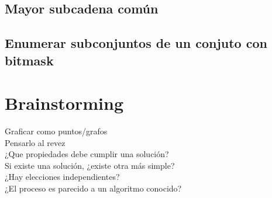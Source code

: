     \subsection{Mayor subcadena común}
    \subsection{Enumerar subconjuntos de un conjuto con bitmask}

\section{Brainstorming}
Graficar como puntos/grafos \\
Pensarlo al revez \\
¿Que propiedades debe cumplir una solución? \\
Si existe una solución, ¿existe otra más simple? \\
¿Hay elecciones independientes? \\
¿El proceso es parecido a un algoritmo conocido? \\

